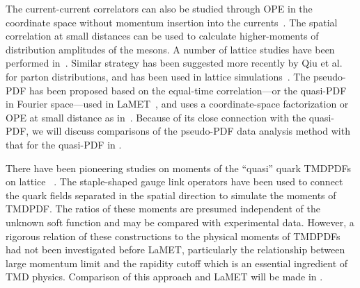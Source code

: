 The current-current correlators can also be studied through OPE
in the coordinate space without momentum insertion into the
currents~\cite{Braun:2007wv}. The spatial correlation at small distances
can be used to calculate higher-moments of distribution amplitudes of the mesons.
A number of lattice studies have been performed in~\cite{Braun:2015axa,Bali:2018spj,Bali:2019dqc}.
Similar strategy has been suggested more recently by Qiu et al.~\cite{Ma:2017pxb}
for parton distributions, and has been used in lattice simulations~\cite{Sufian:2019bol,Sufian:2020vzb}.
The pseudo-PDF has been proposed based on the equal-time correlation---or the quasi-PDF in Fourier space---used
in LaMET~\cite{Radyushkin:2017cyf,Radyushkin:2019owq}, and uses a coordinate-space factorization or OPE at small distance
as in~\cite{Braun:2007wv}. Because of its close connection with the quasi-PDF, we
will discuss comparisons of the pseudo-PDF data analysis method with that for the quasi-PDF
in .

There have been pioneering studies on moments of the ``quasi'' quark TMDPDFs on lattice ~\cite{Hagler:2009mb,Musch:2010ka,Musch:2011er,Engelhardt:2015xja,Yoon:2017qzo}.
The staple-shaped gauge link operators have been used to connect the quark fields
separated in the spatial direction to simulate the moments of TMDPDF. The ratios of these moments
are presumed independent of the unknown soft function and may be compared with experimental data.
However, a rigorous relation of these constructions to the physical moments of TMDPDFs
had not been investigated before LaMET, particularly the relationship between
large momentum limit and the rapidity cutoff which is an essential ingredient of
TMD physics. Comparison of this approach and LaMET will be made in .
